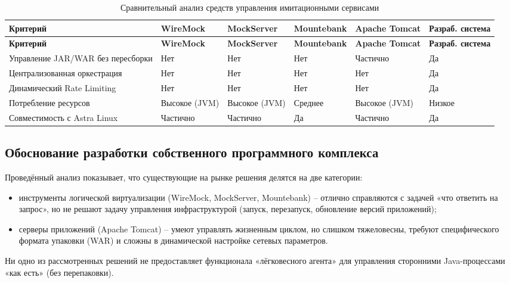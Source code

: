 {\small
\begin{xltabular}{\textwidth}{|p{3.2cm}|X|X|X|X|X|}
\caption{Сравнительный анализ средств управления имитационными сервисами} \label{tab:comparison} \\
\hline
\textbf{Критерий} & \textbf{Wire\-Mock} & \textbf{Mock\-Server} & \textbf{Mounte\-bank} & \textbf{Apache Tomcat} & \textbf{Разраб. система} \\ \hline
\endfirsthead
\hline
\textbf{Критерий} & \textbf{Wire\-Mock} & \textbf{Mock\-Server} & \textbf{Mounte\-bank} & \textbf{Apache Tomcat} & \textbf{Разраб. система} \\ \hline
\endhead

Управление JAR/WAR без пересборки & Нет & Нет & Нет & Частично & Да \\ \hline
Централизо\-ванная оркестрация & Нет & Нет & Нет & Нет & Да \\ \hline
Динами\-ческий Rate Limiting & Нет & Нет & Нет & Нет & Да \\ \hline
Потребление ресурсов & Высокое (JVM) & Высокое (JVM) & Среднее & Высокое (JVM) & Низкое \\ \hline
Совмести\-мость с Astra Linux & Частично & Частично & Да & Частично & Да \\ \hline
\end{xltabular}
}

\subsection{Обоснование разработки собственного программного комплекса}

Проведённый анализ показывает, что существующие на рынке решения делятся на две категории:

\begin{itemize}
\item инструменты логической виртуализации (WireMock, MockServer, Mountebank) -- отлично справляются с задачей «что ответить на запрос», но не решают задачу управления инфраструктурой (запуск, перезапуск, обновление версий приложений);
\item серверы приложений (Apache Tomcat) -- умеют управлять жизненным циклом, но слишком тяжеловесны, требуют специфического формата упаковки (WAR) и сложны в динамической настройке сетевых параметров.
\end{itemize}

Ни одно из рассмотренных решений не предоставляет функционала «лёгковесного агента» для управления сторонними Java-процессами «как есть» (без перепаковки).

